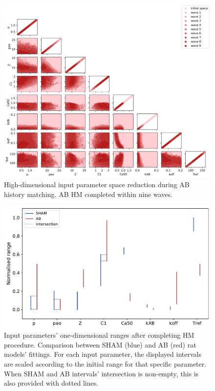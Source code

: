 \begin{figure}[!ht]
    \myfloatalign
    \includegraphics[width=\textwidth]{figures/chapter04/hm_ab.png}
    \caption{High-dimensional input parameter space reduction during AB history matching. AB HM completed within nine waves.}
    \label{fig:abspacered}
\end{figure}

\begin{figure}[!ht]
    \myfloatalign
    \includegraphics[width=\textwidth]{figures/chapter04/sham_vs_ab_final_ranges.pdf}
    \caption{Input parameters’ one-dimensional ranges after completing HM procedure. Comparison between SHAM (blue) and AB (red) rat models’ fittings. For each input parameter, the displayed intervals are scaled according to the initial range for that specific parameter. When SHAM and AB intervals’ intersection is non-empty, this is also provided with dotted lines.}
\end{figure}

